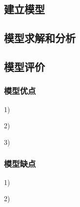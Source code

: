 \documentclass[nocover]{cumcmart}%
\begin{document}
\subsection{建立模型}


\subsection{模型求解和分析}


\subsection{模型评价}
\subsubsection{模型优点}
1)	

2)	

3)	

\subsubsection{模型缺点}
1)	

2)	





\end{document}
